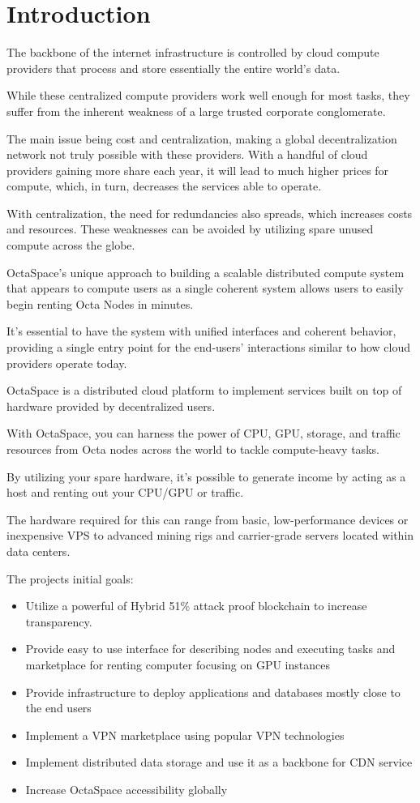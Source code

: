 \section{Introduction}
The backbone of the internet infrastructure is controlled by cloud compute providers that process and store essentially the entire world's data.

While these centralized compute providers work well enough for most tasks, they suffer from the inherent weakness of a large trusted corporate conglomerate.

The main issue being cost and centralization, making a global decentralization network not truly possible with these providers. With a handful of cloud providers gaining more share each year, it will lead to much higher prices for compute, which, in turn, decreases the services able to operate.

With centralization, the need for redundancies also spreads, which increases costs and resources.
These weaknesses can be avoided by utilizing spare unused compute across the globe.

OctaSpace's unique approach to building a scalable distributed compute system that appears to compute users as a single coherent system allows users to easily begin renting Octa Nodes in minutes.

It's essential to have the system with unified interfaces and coherent behavior, providing a single entry point for the end-users' interactions similar to how cloud providers operate today.

OctaSpace is a distributed cloud platform to implement services built on top of hardware provided by decentralized users.

With OctaSpace, you can harness the power of CPU, GPU, storage, and traffic resources from Octa nodes across the world to tackle compute-heavy tasks.

By utilizing your spare hardware, it's possible to generate income by acting as a host and renting out your CPU/GPU or traffic.

The hardware required for this can range from basic, low-performance devices or inexpensive VPS to advanced mining rigs and carrier-grade servers located within data centers.

The projects initial goals:

\begin{itemize}
    \item Utilize a powerful of Hybrid 51\% attack proof blockchain to increase transparency.
    \item Provide easy to use interface for describing nodes and executing tasks and marketplace for renting computer focusing on GPU instances
    \item Provide infrastructure to deploy applications and databases mostly close to the end users
    \item Implement a VPN marketplace using popular VPN technologies
    \item Implement distributed data storage and use it as a backbone for CDN service
    \item Increase OctaSpace accessibility globally
\end{itemize}


